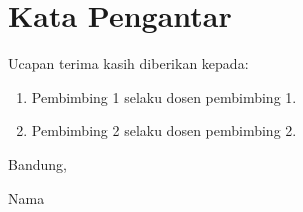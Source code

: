 \chapter*{Kata Pengantar}

\lipsum[1] Ucapan terima kasih diberikan kepada:

\begin{enumerate}
	\item Pembimbing 1 selaku dosen pembimbing 1.
	\item Pembimbing 2 selaku dosen pembimbing 2.
\end{enumerate}

\lipsum[2]

\begin{flushright}
	\vspace{0.5cm}
	Bandung, \dateofapproval
	
	
	\vspace{1.5cm}
	
	Nama
\end{flushright}
